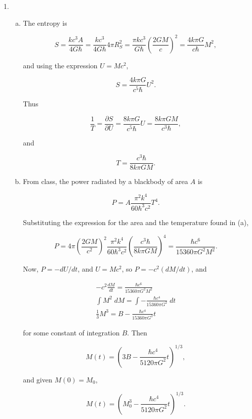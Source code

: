 \documentclass{article}
\begin{document}
\begin{enumerate}
\begin{enumerate}[(a)]
	\end{enumerate}

	\item

	\begin{enumerate}[(a)]

		\item

		The entropy is

		$$S = \frac{k c^3 A}{4 G \hbar} = \frac{k c^3}{4 G \hbar} 4 \pi R_S^2 = \frac{\pi k c^3}{G \hbar} \left( \frac{2GM}{c} \right)^2 = \frac{4 k \pi G}{c \hbar} M^2,$$

		and using the expression $U = Mc^2$, 

		$$S = \frac{4 k \pi G}{c^5 \hbar} U^2.$$

		Thus

		$$\frac{1}{T} = \frac{\partial S}{\partial U} = \frac{8 k \pi G}{c^5 \hbar} U = \frac{8 k \pi G M}{c^3 \hbar},$$

		and 

		$$T = \frac{c^3 \hbar}{8 k \pi G M}.$$

		\item

		From class, the power radiated by a blackbody of area $A$ is 

		$$P = A \frac{\pi^2 k^4}{60 \hbar^3 c^2}T^4.$$

		Substituting the expression for the area and the temperature found in (a),

		$$P = 4 \pi \left( \frac{2GM}{c^2} \right)^2 \frac{\pi^2 k^4}{60 \hbar^3 c^2} \left( \frac{c^3 \hbar}{8 k \pi G M} \right)^4 = \frac{\hbar c^6}{15360 \pi G^2 M^2}.$$

		Now, $P = -dU/dt$, and $U = Mc^2$, so $P = -c^2(dM/dt)$, and

		\begin{gather*}
		-c^2 \frac{dM}{dt} = \frac{\hbar c^6}{15360 \pi G^2 M^2} \\
		\int M^2 \; dM =  \int -\frac{\hbar c^4}{15360 \pi G^2} \; dt \\
		\frac{1}{3}M^3 = B - \frac{\hbar c^4}{15360 \pi G^2} t
		\end{gather*}

		for some constant of integration $B$. Then

		$$M(t) = \left( 3B - \frac{\hbar c^4}{5120 \pi G^2}t  \right)^{1/3},$$

		and given $M(0) = M_0$, 

		$$M(t) = \left( M_0^3 - \frac{\hbar c^4}{5120 \pi G^2}t  \right)^{1/3}.$$


\end{enumerate}
\end{enumerate}
\end{document}
